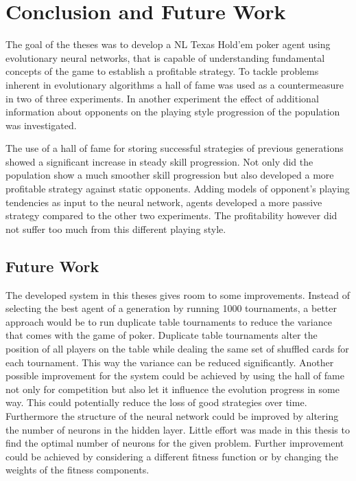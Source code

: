 

\chapter{Conclusion and Future Work }
\label{cha:conclusion}
The goal of the theses was to develop a NL Texas Hold'em poker agent using evolutionary neural networks, that is capable of understanding fundamental concepts of the game to establish a profitable strategy. To tackle problems inherent in evolutionary algorithms a hall of fame was used as a countermeasure in two of three experiments. In another experiment the effect of additional information about opponents on the playing style progression of the population was investigated.\par
The use of a hall of fame for storing successful strategies of previous generations showed a significant increase in steady skill progression. Not only did the population show a much smoother skill progression but also developed a more profitable strategy against static opponents. Adding models of opponent's playing tendencies as input to the neural network, agents developed a more passive strategy compared to the other two experiments. The profitability however did not suffer too much from this different playing style. 
\section{Future Work}
The developed system in this theses gives room to some improvements. Instead of selecting the best agent of a generation by running 1000 tournaments, a better approach would be to run duplicate table tournaments to reduce the variance that comes with the game of poker. Duplicate table tournaments alter the position of all players on the table while dealing the same set of shuffled cards for each tournament. This way the variance can be reduced significantly. Another possible improvement for the system could be achieved by using the hall of fame not only for competition but also let it influence the evolution progress in some way. This could potentially reduce the loss of good strategies over time. Furthermore the structure of the neural network could be improved by altering the number of neurons in the hidden layer. Little effort was made in this thesis to find the optimal number of neurons for the given problem. Further improvement could be achieved by considering a different fitness function or by changing the weights of the fitness components. 

